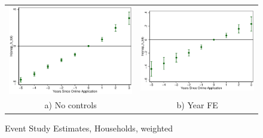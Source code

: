 \documentclass[11pt,letterpaper]{article}
\begin{document}
\begin{figure}\caption{Event Study Estimates, Households, weighted}
\begin{tabular}{cc}
\includegraphics[scale=0.57]{tabfig/evstu_snap_h_tot_total_pop_notr_5_3}&\includegraphics[scale=0.57]{tabfig/evstu_snap_h_tot_total_pop_year_5_3}\\
a) No controls&b) Year FE\\

\end{tabular}
\end{figure}
\end{document}
